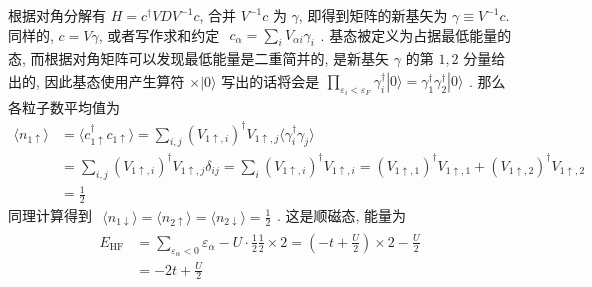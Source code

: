 \documentclass[../../main.tex]{subfiles}
\begin{document}
\begin{enumerate}
  根据对角分解有 $H = c^{\dagger}VDV^{-1}c$, 合并 $V^{-1}c$ 为 $\gamma$, 即得到矩阵的新基矢为 $\gamma\equiv V^{-1}c$. 同样的, $c = V\gamma$, 或者写作求和约定 $\begin{aligned}
    c_{\alpha} = \sum_{i}V_{\alpha i}\gamma_{i}
  \end{aligned}$. 基态被定义为占据最低能量的态, 而根据对角矩阵可以发现最低能量是二重简并的, 是新基矢 $\gamma$ 的第 $1,2$ 分量给出的, 因此基态使用产生算符 $\times|0\rangle$ 写出的话将会是$\begin{aligned}
    \prod_{\varepsilon_{i}<\varepsilon_{F}}\gamma_{i}^{\dagger}|0\rangle = \gamma_{1}^{\dagger}\gamma_{2}^{\dagger}|0\rangle
  \end{aligned}$. 那么各粒子数平均值为 
  \begin{align*}
    \langle n_{1\uparrow}\rangle 
    &= \langle c_{1\uparrow}^{\dagger}c_{1\uparrow}\rangle
     = \sum_{i,j}(V_{1\uparrow,i})^{\dagger}V_{1\uparrow,j}\langle\gamma_{i}^{\dagger}\gamma_{j}\rangle\\
    &= \sum_{i,j}(V_{1\uparrow, i})^{\dagger}V_{1\uparrow,j}\delta_{ij} 
     = \sum_{i}(V_{1\uparrow, i})^{\dagger}V_{1\uparrow,i} 
     = (V_{1\uparrow,1})^{\dagger}V_{1\uparrow,1} + (V_{1\uparrow,2})^{\dagger}V_{1\uparrow,2} \\
    &= \frac{1}{2}
  \end{align*}
  同理计算得到 $\begin{aligned}
    \langle n_{1\downarrow}\rangle = \langle n_{2\uparrow}\rangle = \langle n_{2\downarrow}\rangle = \frac{1}{2}
  \end{aligned}$. 这是顺磁态, 能量为 
  \begin{align*}
    E_{\text{HF}} &= \sum_{\varepsilon_{\alpha}<0}\varepsilon_{\alpha}
    - U\cdot \frac{1}{2}\frac{1}{2}\times 2 = \left(-t + \frac{U}{2}\right)\times 2 - \frac{U}{2}\\
    &= -2t + \frac{U}{2}
  \end{align*}


\end{enumerate}
\end{document}
